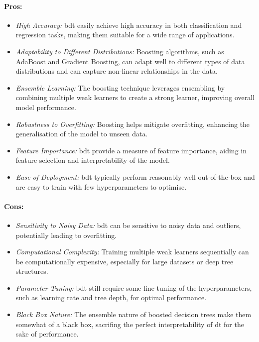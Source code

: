 \paragraph{Pros:}
\begin{itemize}
    \item \textit{High Accuracy:} \gls{bdt} easily achieve high accuracy in both classification and regression tasks, making them suitable for a wide range of applications.
    \item \textit{Adaptability to Different Distributions:} Boosting algorithms, such as AdaBoost and Gradient Boosting, can adapt well to different types of data distributions and can capture non-linear relationships in the data.
    \item \textit{Ensemble Learning:} The boosting technique leverages ensembling by combining multiple weak learners to create a strong learner, improving overall model performance. 
    \item \textit{Robustness to Overfitting:} Boosting helps mitigate overfitting, enhancing the  generalisation of the model to unseen data. 
    \item \textit{Feature Importance:} \gls{bdt} provide a measure of feature importance, aiding in feature selection and interpretability of the model.
    \item \textit{Ease of Deployment:} \gls{bdt} typically perform reasonably well out-of-the-box and are easy to train with few hyperparameters to optimise. 
\end{itemize}

\paragraph{Cons:}
\begin{itemize}
    \item \textit{Sensitivity to Noisy Data:} \gls{bdt} can be sensitive to noisy data and outliers, potentially leading to overfitting.
    \item \textit{Computational Complexity:} Training multiple weak learners sequentially can be computationally expensive, especially for large datasets or deep tree structures.
    \item \textit{Parameter Tuning:} \gls{bdt} still require some fine-tuning of the hyperparameters, such as learning rate and tree depth, for optimal performance.
    \item \textit{Black Box Nature:} The ensemble nature of boosted decision trees make them somewhat of a black box, sacrifing the perfect interpretability of \gls{dt} for the sake of performance.
\end{itemize}

